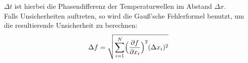 \(\Delta t\) ist hierbei die Phasendifferenz der Temperaturwellen im Abstand \(\Delta x\).
\\
Falls Unsicherheiten auftreten, so wird die Gauß'sche Fehlerformel benutzt, um die resultierende Unsicherheit zu berechnen:
\begin{equation}
    \Delta f = \sqrt{\sum_{i=1}^N  \Bigl(\frac{\partial f}{\partial x_i}\Bigr)^2 (\Delta x_i)^2}
\end{equation}